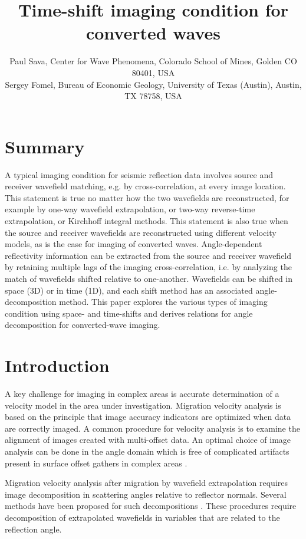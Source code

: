 \title{Time-shift imaging condition for converted waves}
\author{
Paul Sava, Center for Wave Phenomena, Colorado School of Mines, Golden CO 80401, USA \\
Sergey Fomel, Bureau of Economic Geology, University of Texas (Austin), Austin, TX 78758, USA
}

\maketitle



\section{Summary}
A typical imaging condition for seismic reflection data 
involves source and receiver wavefield matching, e.g. by
cross-correlation, at every image location. 
This statement is true no matter how the two wavefields
are reconstructed, for example by 
one-way wavefield extrapolation, or
two-way reverse-time extrapolation, or
Kirchhoff integral methods.
This statement is also true when the source and receiver
wavefields are reconstructed using different velocity models,
as is the case for imaging of converted waves.
Angle-dependent reflectivity information can be extracted
from the source and receiver wavefield by retaining multiple lags
of the imaging cross-correlation, i.e. by analyzing the match of 
wavefields shifted relative to one-another.
Wavefields can be shifted in space (3D) or in time (1D), and
each shift method has an associated angle-decomposition method.
This paper explores the various types of imaging condition 
using space- and time-shifts and
derives relations for angle decomposition for converted-wave
imaging.

\section{Introduction}
A key challenge for imaging in complex areas is accurate
determination of a velocity model in the area under investigation.
Migration velocity analysis is based on the principle that
image accuracy indicators are optimized when
data are correctly imaged.
A common procedure for velocity analysis is to examine the
alignment of images created with multi-offset data.
An optimal choice of image analysis can be done in the
angle domain which is free of complicated
artifacts present in surface offset gathers in complex areas
\cite[]{GEO69-02-05620575}.
\par
Migration velocity analysis after migration by wavefield
extrapolation requires image decomposition
in scattering angles relative
to reflector normals. Several methods have
been proposed for such decompositions
\cite[]{GEO55-09-12231234,
SEG-1999-08240827,
SEG-2000-08300833,
GEO67-03-08830889,
XieWu.adcig,
GEO68-03-10651074,
SEG-2003-08890892,
Fomel.seg.3dadcig,
SEG-2003-21042107}.
These procedures require decomposition of
extrapolated wavefields in variables that are
related to the reflection angle.

